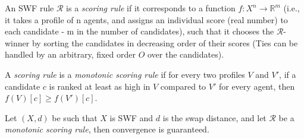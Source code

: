 \documentclass[runningheads,envcountsame]{llncs}
\begin{document}
\begin{definition}
  An SWF rule $\mathcal{R}$ is a \emph{scoring rule} if it corresponds to a function $f : X^n \to \mathbb{R}^m$ (i.e., it takes a profile of n agents, and assigns an individual score (real number) to each candidate - m in the number of candidates), such that it chooses the $\mathcal{R}$-winner by sorting the candidates in decreasing order of their scores (Ties can be handled by an arbitrary, fixed order $O$ over the candidates).
\end{definition}

\begin{definition}
  A \emph{scoring rule} is a \emph{monotonic scoring rule} if for every two profiles $V$ and $V'$, if a candidate $c$ is ranked at least as high in $V$ compared to $V'$ for every agent, then $f(V)[c] \geq f(V')[c]$. 
\end{definition}

\begin{theorem}\label{theorem:scoring} 
  Let $(X, d)$ be such that $X$ is SWF and $d$ is the swap distance, and let $\mathcal{R}$ be a \emph{monotonic scoring rule}, then convergence is guaranteed.
\end{theorem}
\end{document}
